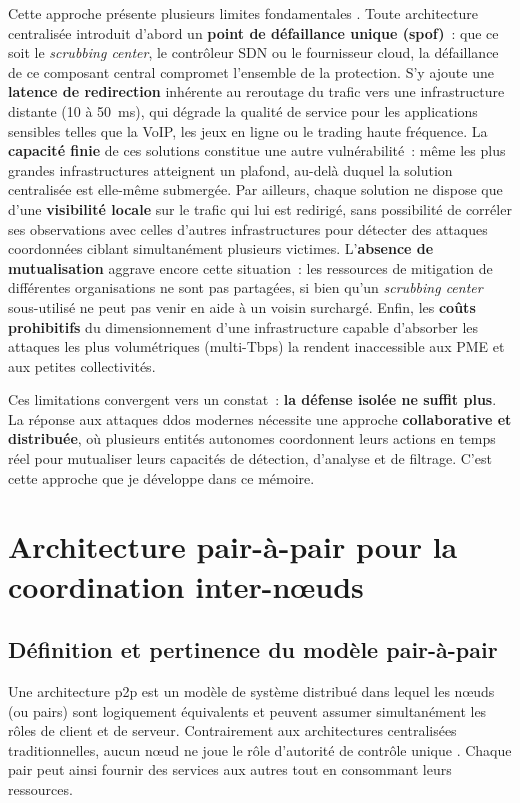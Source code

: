 Cette approche présente plusieurs limites fondamentales \parencite{douligeris2004ddos}. Toute architecture centralisée introduit d'abord un \textbf{point de défaillance unique (\gls{spof})}~: que ce soit le \textit{scrubbing center}, le contrôleur SDN ou le fournisseur cloud, la défaillance de ce composant central compromet l'ensemble de la protection. S'y ajoute une \textbf{latence de redirection} inhérente au reroutage du trafic vers une infrastructure distante (10 à 50~ms), qui dégrade la qualité de service pour les applications sensibles telles que la VoIP, les jeux en ligne ou le trading haute fréquence. La \textbf{capacité finie} de ces solutions constitue une autre vulnérabilité~: même les plus grandes infrastructures atteignent un plafond, au-delà duquel la solution centralisée est elle-même submergée. Par ailleurs, chaque solution ne dispose que d'une \textbf{visibilité locale} sur le trafic qui lui est redirigé, sans possibilité de corréler ses observations avec celles d'autres infrastructures pour détecter des attaques coordonnées ciblant simultanément plusieurs victimes. L'\textbf{absence de mutualisation} aggrave encore cette situation~: les ressources de mitigation de différentes organisations ne sont pas partagées, si bien qu'un \textit{scrubbing center} sous-utilisé ne peut pas venir en aide à un voisin surchargé. Enfin, les \textbf{coûts prohibitifs} du dimensionnement d'une infrastructure capable d'absorber les attaques les plus volumétriques (multi-Tbps) la rendent inaccessible aux PME et aux petites collectivités.

Ces limitations convergent vers un constat~: \textbf{la défense isolée ne suffit plus}. La réponse aux attaques \gls{ddos} modernes nécessite une approche \textbf{collaborative et distribuée}, où plusieurs entités autonomes coordonnent leurs actions en temps réel pour mutualiser leurs capacités de détection, d'analyse et de filtrage. C'est cette approche que je développe dans ce mémoire.
\section{Architecture pair-à-pair pour la coordination inter-n\oe{}uds}
\label{sec:p2p}

\subsection{Définition et pertinence du modèle pair-à-pair}

Une architecture \gls{p2p} est un modèle de système distribué dans lequel les n\oe{}uds (ou pairs) sont logiquement équivalents et peuvent assumer simultanément les rôles de client et de serveur. Contrairement aux architectures centralisées traditionnelles, aucun n\oe{}ud ne joue le rôle d'autorité de contrôle unique \parencite{tanenbaum2017distributed}. Chaque pair peut ainsi fournir des services aux autres tout en consommant leurs ressources.

